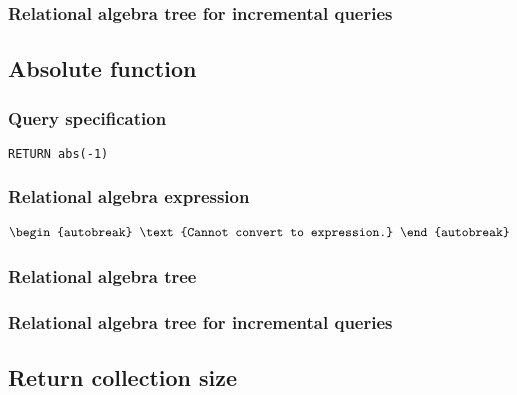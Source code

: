 
\subsubsection*{Relational algebra tree for incremental queries}


\subsection{Absolute function}

\subsubsection*{Query specification}

\begin{lstlisting}
RETURN abs(-1)
\end{lstlisting}

\subsubsection*{Relational algebra expression}

\begin{align*}
\begin{autobreak}
\text{Cannot convert to expression.}
\end{autobreak}
\end{align*}

\subsubsection*{Relational algebra tree}


\subsubsection*{Relational algebra tree for incremental queries}


\subsection{Return collection size}

